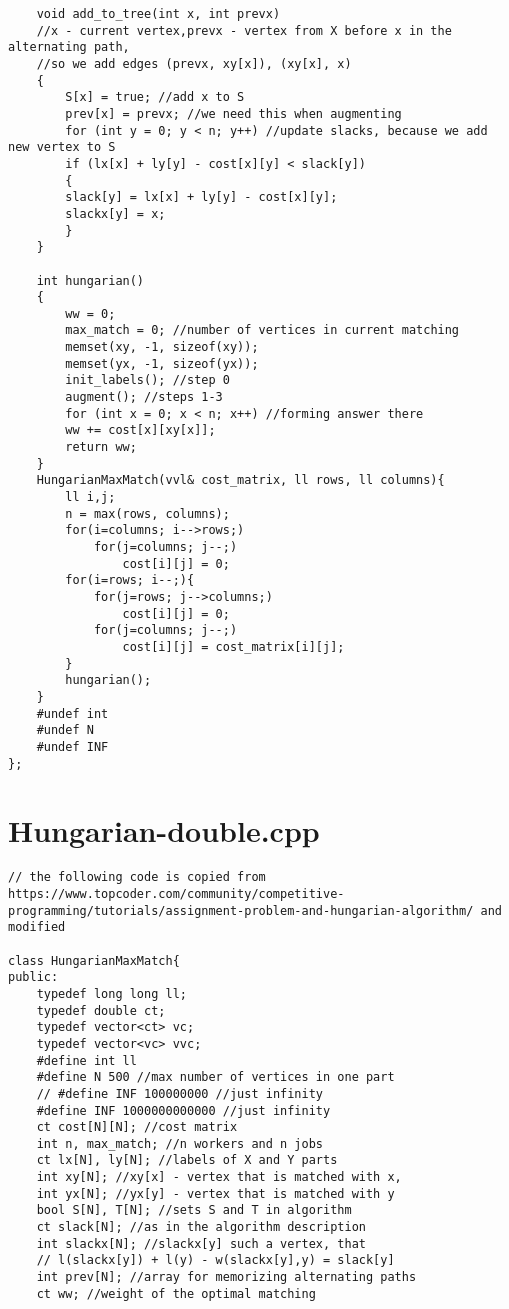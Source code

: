 \documentclass[a4paper,landscape,8pt]{extarticle}
\begin{document}
\begin{multicols}{3}
\begin{lstlisting}
    void add_to_tree(int x, int prevx)
    //x - current vertex,prevx - vertex from X before x in the alternating path,
    //so we add edges (prevx, xy[x]), (xy[x], x)
    {
        S[x] = true; //add x to S
        prev[x] = prevx; //we need this when augmenting
        for (int y = 0; y < n; y++) //update slacks, because we add new vertex to S
        if (lx[x] + ly[y] - cost[x][y] < slack[y])
        {
        slack[y] = lx[x] + ly[y] - cost[x][y];
        slackx[y] = x;
        }
    }

    int hungarian()
    {
        ww = 0;
        max_match = 0; //number of vertices in current matching
        memset(xy, -1, sizeof(xy));
        memset(yx, -1, sizeof(yx));
        init_labels(); //step 0
        augment(); //steps 1-3
        for (int x = 0; x < n; x++) //forming answer there
        ww += cost[x][xy[x]];
        return ww;
    }
    HungarianMaxMatch(vvl& cost_matrix, ll rows, ll columns){
        ll i,j;
        n = max(rows, columns);
        for(i=columns; i-->rows;)
            for(j=columns; j--;)
                cost[i][j] = 0;
        for(i=rows; i--;){
            for(j=rows; j-->columns;)
                cost[i][j] = 0;
            for(j=columns; j--;)
                cost[i][j] = cost_matrix[i][j];
        }
        hungarian();
    }
    #undef int
    #undef N
    #undef INF
};
\end{lstlisting}

\section*{Hungarian-double.cpp}

\begin{lstlisting}
// the following code is copied from https://www.topcoder.com/community/competitive-programming/tutorials/assignment-problem-and-hungarian-algorithm/ and modified

class HungarianMaxMatch{
public:
    typedef long long ll;
    typedef double ct;
    typedef vector<ct> vc;
    typedef vector<vc> vvc;
    #define int ll
    #define N 500 //max number of vertices in one part
    // #define INF 100000000 //just infinity
    #define INF 1000000000000 //just infinity
    ct cost[N][N]; //cost matrix
    int n, max_match; //n workers and n jobs
    ct lx[N], ly[N]; //labels of X and Y parts
    int xy[N]; //xy[x] - vertex that is matched with x,
    int yx[N]; //yx[y] - vertex that is matched with y
    bool S[N], T[N]; //sets S and T in algorithm
    ct slack[N]; //as in the algorithm description
    int slackx[N]; //slackx[y] such a vertex, that
    // l(slackx[y]) + l(y) - w(slackx[y],y) = slack[y]
    int prev[N]; //array for memorizing alternating paths
    ct ww; //weight of the optimal matching


\end{lstlisting}
\end{multicols}
\end{document}
